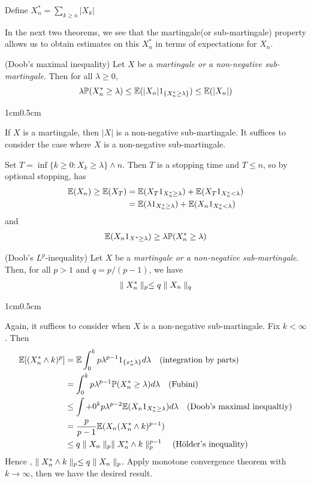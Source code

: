 \documentclass[10pt,a4paper]{report}
\newenvironment{proof}
{\begin{changemargin}{1cm}{0.5cm} 
	}%
	{\end{changemargin}
}
\begin{document}
\quad Define $X_n^* = \sum_{k\geq n} |X_k|$
\s

In the next two theorems, we see that the martingale(or sub-martingale) property allows us to obtain estimates on this $X_n^*$ in terms of expectations for $X_n$.\\
\s

 (Doob's maximal inequality) Let $X$ be a \emph{martingale or a non-negative sub-martingale}. Then for all $\lambda \geq 0$,
\begin{align*}
\lambda \mathbb{P}(X_n^* \geq \lambda) \leq \mathbb{E}(|X_n|   1_{\{ X_n^*\geq \lambda \}}) \leq \mathbb{E}(|X_n|)
\end{align*}
\begin{proof}
\pf If $X$ is a martingale, then $|X|$ is a non-negative sub-martingale. It suffices to consider the case where $X$ is a non-negative sub-martingale.

\quad Set $T = \inf \{ k \geq 0 : X_k \geq \lambda \} \wedge n$. Then $T$ is a stopping time and $T\leq n$, so by optional stopping, has
\begin{align*}
\mathbb{E}(X_n) \geq \mathbb{E}(X_T) &= \mathbb{E}(X_T 1_{X^*_n \geq \lambda}) + \mathbb{E}(X_T 1_{X^*_n < \lambda}) \\
& = \mathbb{E}( \lambda 1_{X^*_n \geq \lambda})  + \mathbb{E}(X_n 1_{X_n^* < \lambda})
\end{align*}
and
\begin{align*}
\mathbb{E}(X_n 1_{X^* \geq \lambda}) \geq \lambda \mathbb{P}(X^*_n \geq \lambda)
\end{align*}

\eop
\end{proof}
\s

 (Doob's $L^p$-inequality) Let $X$ be a \emph{martingale or a non-negative sub-martingale}. Then, for all $p>1$ and $q = p/(p-1)$, we have
\begin{align*}
\parallel X^*_n \parallel_{p} \leq q \parallel X_n \parallel_{q} 
\end{align*}
\begin{proof}
\pf Again, it suffices to consider when $X$ is a non-negative sub-martingale. Fix $k < \infty$. Then
\begin{align*}
\mathbb{E} [ (X^*_n \wedge k)^p  ] &= \mathbb{E} \int_0^k p \lambda^{p-1} 1_{\{x^*_n \lambda \}} d\lambda \quad \text{(integration by parts)}\\
& = \int_0^k p \lambda^{p-1} \mathbb{P}(X^*_n \geq \lambda) d\lambda \quad \text{(Fubini)} \\
& \leq \int+0^k p\lambda^{p-2} \mathbb{E} (X_n 1_{X^*_n \geq \lambda}) d\lambda \quad \text{(Doob's maximal inequaltiy)} \\
& =\frac{p}{p-1} \mathbb{E}(X_n (X^*_n \wedge k)^{p-1} ) \\
& \leq q \parallel X_n \parallel_{p} \parallel X^*_n \wedge k \parallel_{p}^{p-1} \quad \text{(H\"{o}lder's inequality)}
\end{align*}
Hence , $\parallel X^*_n \wedge k \parallel_{p} \leq q\parallel X_n \parallel_{p}$. Apply monotone convergence theorem with $k\rightarrow \infty$, then we have the desired result.

\eop
\end{proof}
\s
\end{document}
